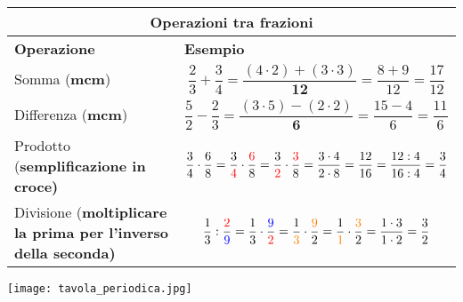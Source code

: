 \documentclass[14pt]{extarticle}
\begin{document}
\clearpage

\begin{table}
    \begin{tabular}{|m{0.4\linewidth}|m{0.6\linewidth}|}
        \hline
        \multicolumn{2}{|c|}{\large{\textbf{Operazioni tra frazioni}}}\\
        \hline
        \hline
        \textbf{Operazione} & \textbf{Esempio }\\
        \hline
        Somma (\textbf{mcm}) & \[\dfrac{2}{3}+\dfrac{3}{4}=\dfrac{(4\cdot2)+(3\cdot3)}{\textbf{12}}=\dfrac{8+9}{12}=\dfrac{17}{12}\]\\
        \hline
        Differenza (\textbf{mcm}) & \[\dfrac{5}{2}-\dfrac{2}{3}=\dfrac{(3\cdot5)-(2\cdot2)}{\textbf{6}}=\dfrac{15-4}{6}=\dfrac{11}{6}\]\\
        \hline
        Prodotto (\textbf{semplificazione in croce)} & \[\dfrac{3}{4}\cdot\dfrac{6}{8}=\dfrac{3}{\textcolor{red}{4}}\cdot\dfrac{\textcolor{red}{6}}{8}=\dfrac{3}{\textcolor{red}{2}}\cdot\dfrac{\textcolor{red}{3}}{8}=\dfrac{3\cdot4}{2\cdot8}=\dfrac{12}{16}=\dfrac{12:4}{16:4}=\dfrac{3}{4}\]\\
        \hline
        Divisione (\textbf{moltiplicare la prima per l'inverso della seconda)}& \[\dfrac{1}{3}:\dfrac{\textcolor{red}{2}}{\textcolor{blue}{9}}=\dfrac{1}{3}\cdot\dfrac{\textcolor{blue}{9}}{\textcolor{red}{2}}=\dfrac{1}{\textcolor{orange}{3}}\cdot\dfrac{\textcolor{orange}{9}}{2}=\dfrac{1}{\textcolor{orange} {1}}\cdot\dfrac{\textcolor{orange}{3}}{2}=\dfrac{1\cdot3}{1\cdot2}=\dfrac{3}{2}\]\\
        \hline
        \hline
    \end{tabular}
\end{table}
\begin{center}
\texttt{[image: tavola\_periodica.jpg]}
\end{center}
\clearpage
\end{document}
